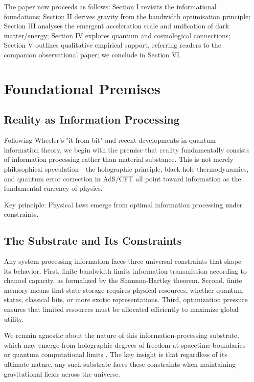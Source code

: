 \documentclass[twocolumn,prd,amsmath,amssymb,aps,superscriptaddress,nofootinbib]{revtex4-2}
\begin{document}
The paper now proceeds as follows: Section I revisits the informational foundations; Section II derives gravity from the bandwidth optimisation principle; Section III analyses the emergent acceleration scale and unification of dark matter/energy; Section IV explores quantum and cosmological connections; Section V outlines qualitative empirical support, referring readers to the companion observational paper; we conclude in Section VI.

\section{Foundational Premises}
\label{sec:foundations}

\subsection{Reality as Information Processing}

Following Wheeler's "it from bit" and recent developments in quantum information theory, we begin with the premise that reality fundamentally consists of information processing rather than material substance. This is not merely philosophical speculation---the holographic principle, black hole thermodynamics, and quantum error correction in AdS/CFT all point toward information as the fundamental currency of physics.

Key principle: Physical laws emerge from optimal information processing under constraints.

\subsection{The Substrate and Its Constraints}

Any system processing information faces three universal constraints that shape its behavior. First, finite bandwidth limits information transmission according to channel capacity, as formalized by the Shannon-Hartley theorem. Second, finite memory means that state storage requires physical resources, whether quantum states, classical bits, or more exotic representations. Third, optimization pressure ensures that limited resources must be allocated efficiently to maximize global utility.

We remain agnostic about the nature of this information-processing substrate, which may emerge from holographic degrees of freedom at spacetime boundaries \cite{Susskind1995} or quantum computational limits \cite{Lloyd2002}. The key insight is that regardless of its ultimate nature, any such substrate faces these constraints when maintaining gravitational fields across the universe.
\end{document}
